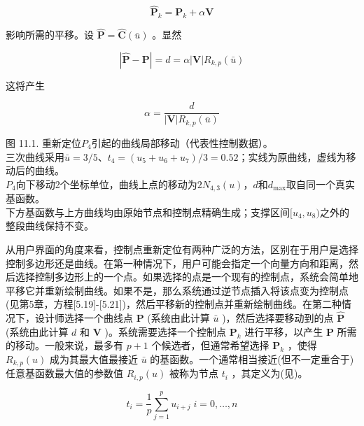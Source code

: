 \documentclass[../main.tex]{subfiles}
\begin{document}
\[
{\widehat{\mathbf{P}}}_{k} = {\mathbf{P}}_{k} + \alpha \mathbf{V} \tag{11.2}
\]

影响所需的平移。设 \(\widehat{\mathbf{P}} = \widehat{\mathbf{C}}\left( \bar{u}\right)\) 。显然

\[
\left| {\widehat{\mathbf{P}} - \mathbf{P}}\right|  = d = \alpha \left| \mathbf{V}\right| {R}_{k,p}\left( \bar{u}\right)
\]

这将产生

\[
\alpha  = \frac{d}{\left| \mathbf{V}\right| {R}_{k,p}\left( \bar{u}\right) } \tag{11.3}
\]



\begin{center}
\begin{minipage}{26cm}
\vspace*{.6\baselineskip}
\centering
{}
\par\smallskip
图 11.1. 重新定位$P_4$引起的曲线局部移动（代表性控制数据）。\\
三次曲线采用$\bar u=3/5$、$t_4=(u_5+u_6+u_7)/3=0.52$；实线为原曲线，虚线为移动后的曲线。\\
$P_4$向下移动2个坐标单位，曲线上点的移动为$2N_{4,3}(u)$，$d$和$d_{\max}$取自同一个真实基函数。\\
下方基函数与上方曲线均由原始节点和控制点精确生成；支撑区间$[u_4,u_8)$之外的整段曲线保持不变。
\end{minipage}
\end{center}

从用户界面的角度来看，控制点重新定位有两种广泛的方法，区别在于用户是选择控制多边形还是曲线。在第一种情况下，用户可能会指定一个向量方向和距离，然后选择控制多边形上的一个点。如果选择的点是一个现有的控制点，系统会简单地平移它并重新绘制曲线。如果不是，那么系统通过逆节点插入将该点变为控制点(见第5章，方程[5.19]-[5.21])，然后平移新的控制点并重新绘制曲线。在第二种情况下，设计师选择一个曲线点 \(\mathbf{P}\) (系统由此计算 \(\bar{u}\) )，然后选择要移动到的点 \(\widehat{\mathbf{P}}\) (系统由此计算 \(d\) 和 \(\mathbf{V}\) )。系统需要选择一个控制点 \({\mathbf{P}}_{k}\) 进行平移，以产生 \(\mathbf{P}\) 所需的移动。一般来说，最多有 \(p + 1\) 个候选者，但通常希望选择 \({\mathbf{P}}_{k}\) ，使得 \({R}_{k,p}\left( u\right)\) 成为其最大值最接近 \(\bar{u}\) 的基函数。一个通常相当接近(但不一定重合于)任意基函数最大值的参数值 \({R}_{i,p}\left( u\right)\) 被称为节点 \({t}_{i}\) ，其定义为(见\cite{Ries73})。

\[
{t}_{i} = \frac{1}{p}\mathop{\sum }\limits_{{j = 1}}^{p}{u}_{i + j}\;i = 0,\ldots ,n \tag{11.4}
\]
\end{document}
